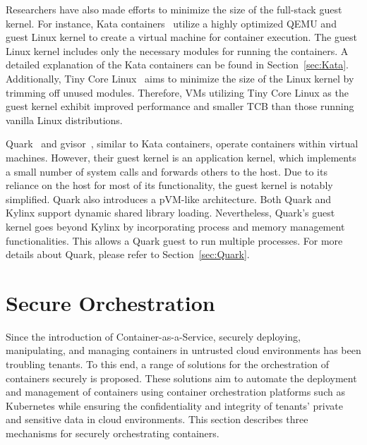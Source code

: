 Researchers have also made efforts to minimize the size of the full-stack guest kernel. For instance, Kata containers~\cite*{Kata-Containers} utilize a highly optimized QEMU and guest Linux kernel to create a virtual machine for container execution. The guest Linux kernel includes only the necessary modules for running the containers. 
A detailed explanation of the Kata containers can be found in Section~\ref{sec:Kata}. Additionally, Tiny Core Linux~\cite*{tiny_linux} aims to minimize the size of the Linux kernel by trimming off unused modules. Therefore, VMs utilizing Tiny Core Linux as the guest kernel exhibit improved performance and smaller \acrshort{TCB} than those running vanilla Linux distributions.


Quark~\cite*{quark} and gvisor~\cite*{gvisor}, similar to Kata containers, operate containers within virtual machines. However, their guest kernel is an application kernel, which implements a small number of system calls and forwards others to the host. Due to its reliance on the host for most of its functionality, the guest kernel is notably simplified. Quark also introduces a pVM-like 
architecture. Both Quark and Kylinx support dynamic shared library loading. Nevertheless, Quark's guest kernel goes beyond Kylinx by incorporating process and memory management functionalities. This allows a Quark guest to run multiple processes. For more details about Quark, please refer to Section~\ref{sec:Quark}.


\section{Secure Orchestration}
Since the introduction of Container-as-a-Service, securely deploying, manipulating, and managing containers in untrusted cloud environments has been troubling tenants. To this end, a range of solutions for the orchestration of containers securely is proposed. These solutions aim to automate the deployment and management of containers using container orchestration platforms such as Kubernetes while ensuring the 
confidentiality and integrity of tenants' private and sensitive data in cloud environments. This section describes three mechanisms for securely orchestrating containers.

